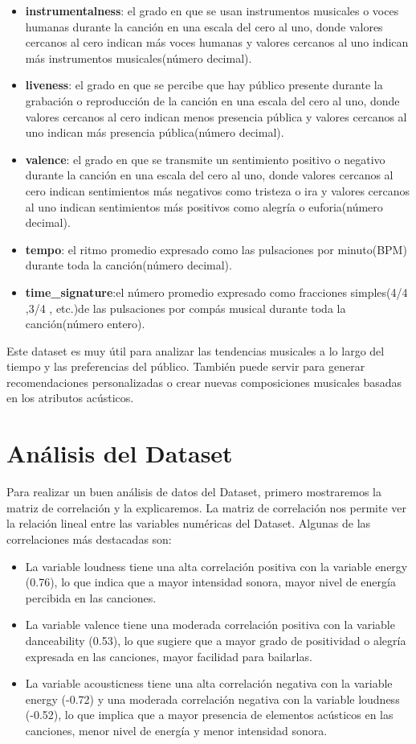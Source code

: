 \documentclass{wsdcr}
\begin{document}
\begin{itemize}
    \item \textbf{instrumentalness}: el grado en que se usan instrumentos musicales o voces humanas durante la canción en una escala del cero al uno, donde valores cercanos al cero indican más voces humanas y valores cercanos al uno indican más instrumentos musicales(número decimal).
    \item \textbf{liveness}: el grado en que se percibe que hay público presente durante la grabación o reproducción de la canción en una escala del cero al uno, donde valores cercanos al cero indican menos presencia pública y valores cercanos al uno indican más presencia pública(número decimal).
    \item \textbf{valence}: el grado en que se transmite un sentimiento positivo o negativo durante la canción en una escala del cero al uno, donde valores cercanos al cero indican sentimientos más negativos como tristeza o ira y valores cercanos al uno indican sentimientos más positivos como alegría o euforia(número decimal).
    \item \textbf{tempo}: el ritmo promedio expresado como las pulsaciones por minuto(BPM) durante toda la canción(número decimal).
    \item \textbf{time\_signature}:el número promedio expresado como fracciones simples(4/4 ,3/4 , etc.)de las pulsaciones por compás musical durante toda la canción(número entero).
\end{itemize}

Este dataset es muy útil para analizar las tendencias musicales a lo largo del tiempo y las preferencias del público. También puede servir para generar recomendaciones personalizadas o crear nuevas composiciones musicales basadas en los atributos acústicos.

\section{Análisis del Dataset}

Para realizar un buen análisis de datos del Dataset, primero mostraremos la matriz de correlación y la explicaremos. La matriz de correlación nos permite ver la relación lineal entre las variables numéricas del Dataset. Algunas de las correlaciones más destacadas son:

\begin{itemize}
    \item La variable loudness tiene una alta correlación positiva con la variable energy (0.76), lo que indica que a mayor intensidad sonora, mayor nivel de energía percibida en las canciones.
    \item La variable valence tiene una moderada correlación positiva con la variable danceability (0.53), lo que sugiere que a mayor grado de positividad o alegría expresada en las canciones, mayor facilidad para bailarlas.
    \item La variable acousticness tiene una alta correlación negativa con la variable energy (-0.72) y una moderada correlación negativa con la variable loudness (-0.52), lo que implica que a mayor presencia de elementos acústicos en las canciones, menor nivel de energía y menor intensidad sonora.
\end{itemize}
\end{document}
